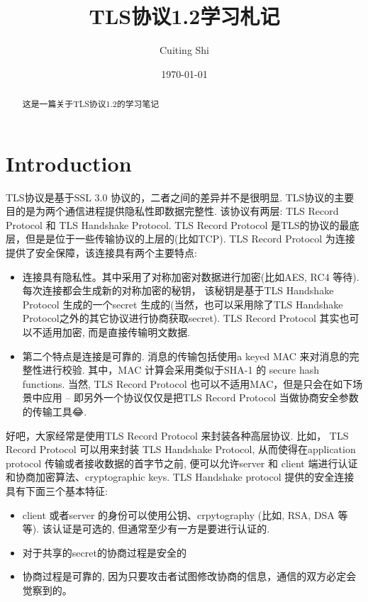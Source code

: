 \documentclass[a4paper]{ctexart}
\title{\heiti{}TLS协议1.2学习札记}
\author{\kaishu Cuiting Shi}
\date{\today{}}
\begin{document}
\maketitle{}
\begin{abstract}
  这是一篇关于TLS协议1.2的学习笔记
\end{abstract}
\tableofcontents{}

\section{Introduction}
TLS协议是基于SSL 3.0 协议的，二者之间的差异并不是很明显.
TLS协议的主要目的是为两个通信进程提供隐私性即数据完整性. 该协议有两层: TLS Record Protocol 和 TLS Handshake Protocol.
TLS Record Protocol 是TLS的协议的最底层，但是是位于一些传输协议的上层的(比如TCP). 
TLS Record Protocol 为连接提供了安全保障，该连接具有两个主要特点:

\begin{itemize}
    \kaishu 
  \item 连接具有隐私性。其中采用了对称加密对数据进行加密(比如AES, RC4 等待). 每次连接都会生成新的对称加密的秘钥，
    该秘钥是基于TLS Handshake Protocol 生成的一个secret 生成的(当然，也可以采用除了TLS Handshake Protocol之外的其它协议进行协商获取secret). 
    TLS Record Protocol 其实也可以不适用加密, 而是直接传输明文数据.
  \item 第二个特点是连接是可靠的. 消息的传输包括使用a keyed MAC 来对消息的完整性进行校验. 其中，MAC 计算会采用类似于SHA-1 的 secure hash functions.
    当然, TLS Record Protocol 也可以不适用MAC，但是只会在如下场景中应用 -- 即另外一个协议仅仅是把TLS Record Protocol 当做协商安全参数的传输工具😂.
\end{itemize}

好吧，大家经常是使用TLS Record Protocol 来封装各种高层协议. 比如， TLS Record Protocol 可以用来封装 TLS Handshake Protocol, 从而使得在application
protocol 传输或者接收数据的首字节之前, 便可以允许server 和 client 端进行认证和协商加密算法、cryptographic keys. TLS Handshake protocol 提供的安全连接
具有下面三个基本特征: 

\begin{itemize}
    \kaishu 
  \item client 或者server 的身份可以使用公钥、crpytography (比如, RSA, DSA 等等). 该认证是可选的, 但通常至少有一方是要进行认证的.
  \item 对于共享的secret的协商过程是安全的
  \item 协商过程是可靠的, 因为只要攻击者试图修改协商的信息，通信的双方必定会觉察到的。
\end{itemize}
\end{document}
